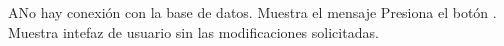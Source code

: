 \label{SP2-CU2-A}
\begin{UCtrayectoriaA}{A}{No hay conexión con la base de datos.}
    \UCpaso Muestra el mensaje 
    \UCpaso[\UCactor] Presiona el botón .
    \UCpaso Muestra intefaz de usuario  sin las modificaciones solicitadas.
\end{UCtrayectoriaA}
